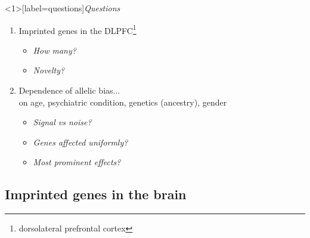 \documentclass{beamer} %
\begin{document}
%
%
%
%
%

\begin{frame}<1>[label=questions]{\textit{Questions} }
\begin{enumerate}
\item Imprinted genes in the DLPFC\footnote{dorsolateral prefrontal
cortex}
\begin{itemize}
\item \textit{How many?} 
\item \textit{Novelty?} 
\end{itemize}
\item Dependence of allelic bias...\\on age, psychiatric condition, genetics
(ancestry),
gender
\begin{itemize}
\item \textit{Signal vs noise?} 
\item \textit{Genes affected uniformly?} 
\item \textit{Most prominent effects?} 
\end{itemize}
\end{enumerate}
\end{frame}

\subsection{Imprinted genes in the brain}
\end{document}
